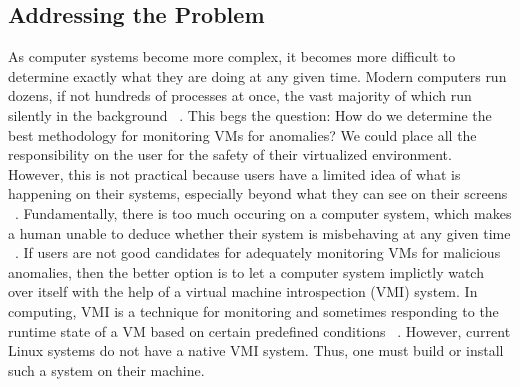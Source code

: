 \documentclass{report}
\begin{document}
\begin{spacing}{1.5}
\section{Addressing the Problem}
{\large
\noindent As computer systems become more complex, it becomes more difficult to determine exactly what they are doing at any given time. Modern computers run dozens, if not hundreds of processes at once, the vast majority of which run silently in the background ~\cite{findlay2021practical}. This begs the question: How do we determine the best methodology for monitoring VMs for anomalies? We could place all the responsibility on the user for the safety of their virtualized environment. However, this is not practical because users have a limited idea of what is happening on their systems, especially beyond what they can see on their screens ~\cite{findlay2021practical}. Fundamentally, there is too much occuring on a computer system, which makes a human unable to deduce whether their system is misbehaving at any given time ~\cite{findlay2021practical}. If users are not good candidates for adequately monitoring VMs for malicious anomalies, then the better option is to let a computer system implictly watch over itself with the help of a virtual machine introspection (VMI) system. In computing, VMI is a technique for monitoring and sometimes responding to the runtime state of a VM based on certain predefined conditions ~\cite{Payne2011}. However, current Linux systems do not have a native VMI system. Thus, one must build or install such a system on their machine.
\newline
}


\end{spacing}
\end{document}

